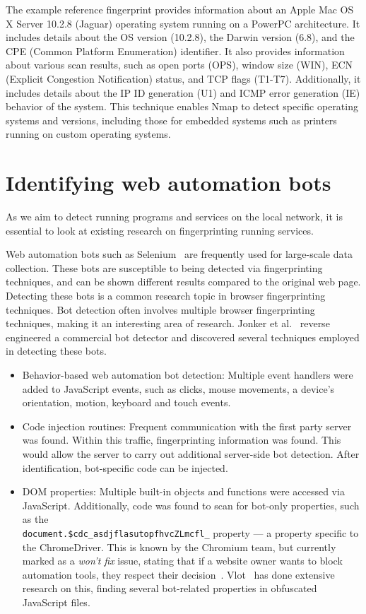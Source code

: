 The example reference fingerprint provides information about an Apple Mac OS X Server 10.2.8 (Jaguar) operating system running on a PowerPC architecture. It includes details about the OS version (10.2.8), the Darwin version (6.8), and the CPE (Common Platform Enumeration) identifier. It also provides information about various scan results, such as open ports (OPS), window size (WIN), ECN (Explicit Congestion Notification) status, and TCP flags (T1-T7). Additionally, it includes details about the IP ID generation (U1) and ICMP error generation (IE) behavior of the system. This technique enables Nmap to detect specific operating systems and versions, including those for embedded systems such as printers running on custom operating systems.

\section{Identifying web automation bots}
As we aim to detect running programs and services on the local network, it is essential to look at existing research on fingerprinting running services. 

Web automation bots such as Selenium~\cite{selenium} are frequently used for large-scale data collection. These bots are susceptible to being detected via fingerprinting techniques, and can be shown different results compared to the original web page. Detecting these bots is a common research topic in browser fingerprinting techniques. Bot detection often involves multiple browser fingerprinting techniques, making it an interesting area of research. 
Jonker et al.~\cite{jonker2019} reverse engineered a commercial bot detector and discovered several techniques employed in detecting these bots.

\begin{itemize}
    \item Behavior-based web automation bot detection: Multiple event handlers were added to JavaScript events, such as clicks, mouse movements, a device's orientation, motion, keyboard and touch events.
    \item Code injection routines: Frequent communication with the first party server was found. Within this traffic, fingerprinting information was found. This would allow the server to carry out additional server-side bot detection. After identification, bot-specific code can be injected.
    \item DOM properties: Multiple built-in objects and functions were accessed via JavaScript. Additionally, code was found to scan for bot-only properties, such as the \\\verb|document.$cdc_asdjflasutopfhvcZLmcfl_| property --- a property specific to the ChromeDriver.
    This is known by the Chromium team, but currently marked as a \emph{won't fix} issue, stating that if a website owner wants to block automation tools, they respect their decision~\cite{chromedriver_bug}.
    Vlot~\cite{vlot2018} has done extensive research on this, finding several bot-related properties in obfuscated JavaScript files. 
\end{itemize}

